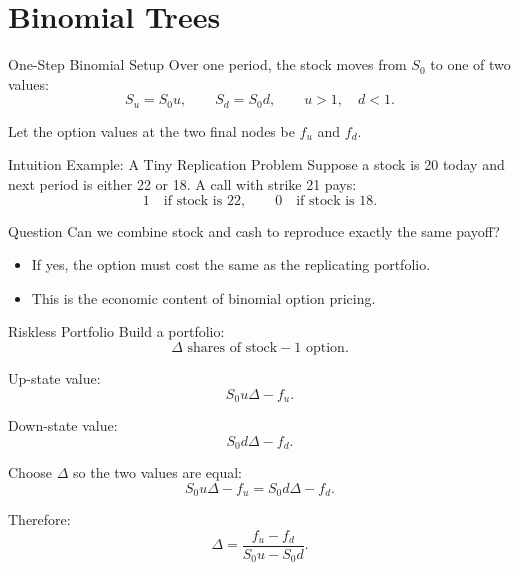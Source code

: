 \documentclass[aspectratio=169,11pt]{beamer}
\begin{document}
\section{Binomial Trees}

\begin{frame}{One-Step Binomial Setup}
    Over one period, the stock moves from \(S_0\) to one of two values:
    \[
        S_u=S_0u,
        \qquad
        S_d=S_0d,
        \qquad
        u>1,\quad d<1.
    \]

    \begin{center}
    \end{center}

    Let the option values at the two final nodes be \(f_u\) and \(f_d\).
\end{frame}

\begin{frame}{Intuition Example: A Tiny Replication Problem}
    Suppose a stock is 20 today and next period is either 22 or 18.
    A call with strike 21 pays:
    \[
        1 \quad \text{if stock is 22},
        \qquad
        0 \quad \text{if stock is 18}.
    \]

    \begin{block}{Question}
        Can we combine stock and cash to reproduce exactly the same payoff?
    \end{block}

    \begin{itemize}
        \item If yes, the option must cost the same as the replicating portfolio.
        \item This is the economic content of binomial option pricing.
    \end{itemize}
\end{frame}

\begin{frame}{Riskless Portfolio}
    Build a portfolio:
    \[
        \Delta \text{ shares of stock} - 1 \text{ option}.
    \]

    Up-state value:
    \[
        S_0u\Delta-f_u.
    \]

    Down-state value:
    \[
        S_0d\Delta-f_d.
    \]

    Choose \(\Delta\) so the two values are equal:
    \[
        S_0u\Delta-f_u=S_0d\Delta-f_d.
    \]

    Therefore:
    \[
        \Delta=\frac{f_u-f_d}{S_0u-S_0d}.
    \]
\end{frame}
\end{document}
